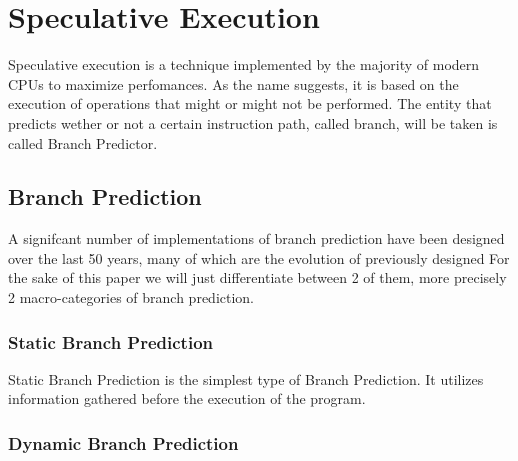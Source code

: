 \section{Speculative Execution}
Speculative execution is a technique implemented by the majority of modern CPUs to maximize perfomances. 
As the name suggests, it is based on the execution of operations that might or might not be performed. The entity that predicts wether or not a certain instruction path, called branch, will be taken is called Branch Predictor.

\subsection{Branch Prediction}
A signifcant number of implementations of branch prediction have been designed over the last 50 years, many of which are the evolution of previously designed 
For the sake of this paper we will just differentiate between 2 of them, more precisely 2 macro-categories of branch prediction.
\subsubsection{Static Branch Prediction}
Static Branch Prediction is the simplest type of Branch Prediction. It utilizes information gathered before the execution of the program.
\subsubsection{Dynamic Branch Prediction}

